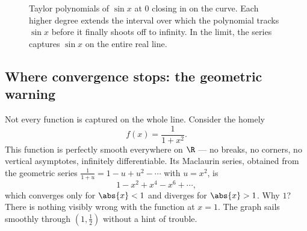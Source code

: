 \begin{figure}[H]
\centering
{}
\caption{Taylor polynomials of $\sin x$ at $0$ closing in on the curve. Each higher
degree extends the interval over which the polynomial tracks $\sin x$ before it finally
shoots off to infinity. In the limit, the series captures $\sin x$ on the entire real
line.}
\label{ch31:fig-sin-taylor}
\end{figure}

\subsection{Where convergence stops: the geometric warning}

Not every function is captured on the whole line. Consider the homely
\[
  f(x) = \frac{1}{1+x^2}.
\]
This function is perfectly smooth everywhere on $\R$ --- no breaks, no corners, no
vertical asymptotes, infinitely differentiable. Its Maclaurin series, obtained from
the geometric series $\frac{1}{1+u} = 1 - u + u^2 - \cdots$ with $u = x^2$, is
\[
  1 - x^2 + x^4 - x^6 + \cdots,
\]
which converges only for $\abs{x} < 1$ and diverges for $\abs{x} > 1$. Why $1$? There
is nothing visibly wrong with the function at $x = 1$. The graph sails smoothly
through $(1, \tfrac12)$ without a hint of trouble.

